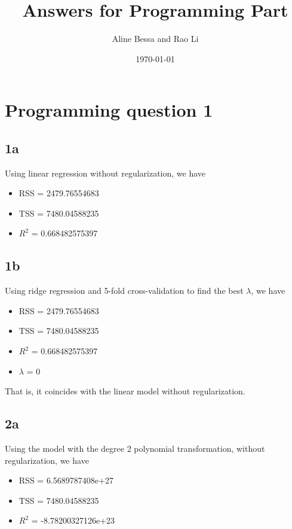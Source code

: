 \documentclass[leqno]{article}
\title{Answers for Programming Part}
\author{Aline Bessa and Rao Li}
\date\today
\begin{document}
\maketitle %

\section*{Programming question 1} 

\subsection*{1a} Using linear regression without regularization, we have

\begin{itemize}
\item RSS = 2479.76554683
\item TSS = 7480.04588235
\item $R^2$ = 0.668482575397
\end{itemize}

\subsection*{1b} Using ridge regression and 5-fold cross-validation to find the best $\lambda$, we have

\begin{itemize}
\item RSS = 2479.76554683
\item TSS = 7480.04588235
\item $R^2$ = 0.668482575397
\item $\lambda$ = 0
\end{itemize}
That is, it coincides with the linear model without regularization.

\subsection*{2a} Using the model with the degree 2 polynomial transformation, without regularization, we have
\begin{itemize}
\item RSS = 6.5689787408e+27
\item TSS = 7480.04588235
\item $R^2$ = -8.78200327126e+23
\end{itemize}
\end{document}
